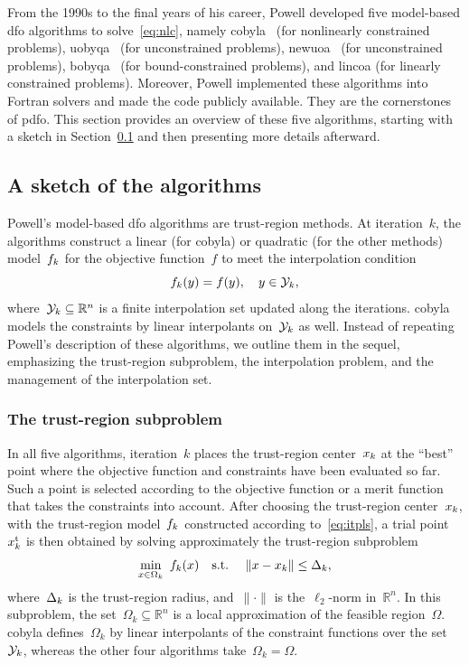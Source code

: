 \documentclass[manuscript,screen,review]{acmart}
\numberwithin{equation}{section}
\newcommand*{\R}{\mathbb{R}}
\newcommand*{\fsetm}[1][k]{\Omega_{#1}}
\newcommand*{\fset}{\Omega}
\newcommand*{\iter}[1][k]{x\ifthenelse{\equal{#1}{}}{}{_{#1}}}
\newcommand*{\norm}[2][]{#1\lVert#2#1\rVert}
\newcommand*{\objm}[1][k]{\obj\ifthenelse{\equal{#1}{}}{}{_{#1}}}
\newcommand*{\obj}{f}
\newcommand*{\rad}[1][k]{\Delta\ifthenelse{\equal{#1}{}}{}{_{#1}}}
\newcommand*{\st}{\text{s.t.}}
\newcommand*{\trust}{{\text{t}}}
\newcommand*{\xpt}[1][k]{\mathcal{Y}\ifthenelse{\equal{#1}{}}{}{_{#1}}}
\begin{document}
From the 1990s to the final years of his career, Powell developed five model-based \gls{dfo} algorithms to solve~\eqref{eq:nlc}, namely \gls{cobyla}~\cite{Powell_1994} (for nonlinearly constrained problems), \gls{uobyqa}~\cite{Powell_2002} (for unconstrained problems), \gls{newuoa}~\cite{Powell_2006} (for unconstrained problems), \gls{bobyqa}~\cite{Powell_2009} (for bound-constrained problems), and \gls{lincoa} (for linearly constrained problems).
Moreover, Powell implemented these algorithms into Fortran solvers and made the code publicly available.
They are the cornerstones of \gls{pdfo}.
This section provides an overview of these five algorithms, starting with a sketch in Section~\ref{subsec:sketch} and then presenting more details afterward.

\subsection{A sketch of the algorithms}
\label{subsec:sketch}

Powell's model-based \gls{dfo} algorithms are trust-region methods.
At iteration~$k$, the algorithms construct a linear (for \gls{cobyla}) or quadratic (for the other methods) model~$\objm$ for the objective function~$f$ to meet the interpolation condition
\begin{equation}
    \label{eq:itpls}
    \objm(y) = \obj(y), \quad y \in \xpt,
\end{equation}
where~$\xpt \subseteq \R^n$ is a finite interpolation set updated along the iterations.
\Gls{cobyla} models the constraints by linear interpolants on~$\xpt$ as well.
Instead of repeating Powell's description of these algorithms, we outline them in the sequel, emphasizing the trust-region subproblem, the interpolation problem, and the management of the interpolation set.

\subsubsection{The trust-region subproblem}

In all five algorithms, iteration~$k$ places the trust-region center~$\iter$ at the ``best'' point where the objective function and constraints have been evaluated so far.
Such a point is selected according to the objective function or a merit function that takes the constraints into account.
After choosing the trust-region center~$\iter$, with the trust-region model~$\objm$ constructed according to~\eqref{eq:itpls}, a trial point~$\iter^{\trust}$ is then obtained by solving approximately the trust-region subproblem
\begin{equation}
    \label{eq:trsp}
    \min_{x \in \fsetm} ~ \objm(x) \quad \st \quad ~ \norm{x - \iter} \le \rad,
\end{equation}
where~$\rad$ is the trust-region radius, and~$\norm{\cdot}$ is the~$\ell_2$-norm in~$\R^n$.
In this subproblem, the set~$\fsetm \subseteq \R^n$ is a local approximation of the feasible region~$\fset$.
\Gls{cobyla} defines~$\fsetm$ by linear interpolants of the constraint functions over the set~$\xpt$, whereas the other four algorithms take~$\fsetm = \fset$.
\end{document}
